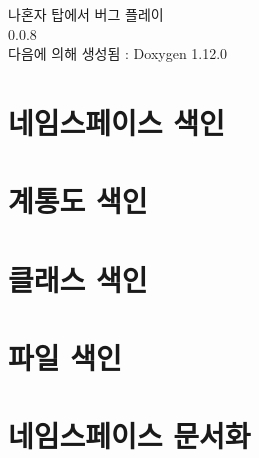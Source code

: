 \documentclass[twoside]{book}
\newcommand{\+}{\discretionary{\mbox{\scriptsize$\hookleftarrow$}}{}{}}
\newcommand{\clearemptydoublepage}{%
    \newpage{\pagestyle{empty}\cleardoublepage}%
  }
\begin{document}
  \raggedbottom
    \hypersetup{pageanchor=false,
                bookmarksnumbered=true,
                pdfencoding=unicode
               }
  \begin{titlepage}
  \vspace*{7cm}
  \begin{center}%
  {\Large 나혼자 탑에서 버그 플레이}\\
  [1ex]\large 0.\+0.\+8 \\
  \vspace*{1cm}
  {\large 다음에 의해 생성됨 \+:  Doxygen 1.12.0}\\
  \end{center}
  \end{titlepage}
  \clearemptydoublepage
  \tableofcontents
  \clearemptydoublepage
  \hypersetup{pageanchor=true}
\chapter{네임스페이스 색인}

\chapter{계통도 색인}

\chapter{클래스 색인}

\chapter{파일 색인}

\chapter{네임스페이스 문서화}

\end{document}
